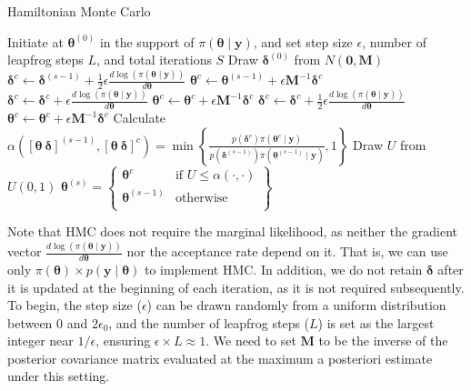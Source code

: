 \begin{algorithm}[h!]
	\caption{Hamiltonian Monte Carlo}\label{Alg:HMC}
	\begin{algorithmic}[1]
		\State Initiate at $\bm{\theta}^{(0)}$ in the support of $\pi(\bm{\theta}\mid \bm{y})$, and set step size $\epsilon$, number of leapfrog steps $L$, and total iterations $S$ 
		\State Draw $\bm{\delta}^{(0)}$ from $N(\bm{0}, \bm{M})$  		 			
					\State $\bm{\delta}^{c} \leftarrow \bm{\delta}^{(s-1)} + \frac{1}{2}\epsilon \frac{d\log(\pi(\bm{\theta}\mid \bm{y}))}{d\bm{\theta}}$
					\State $\bm{\theta}^c\leftarrow \bm{\theta}^{(s-1)}+\epsilon \bm{M}^{-1}\bm{\delta}^{c}$
				\Else
						\State $\bm{\delta}^{c} \leftarrow \bm{\delta}^{c} + \epsilon \frac{d\log(\pi(\bm{\theta}\mid \bm{y}))}{d\bm{\theta}}$
						\State $\bm{\theta}^c\leftarrow \bm{\theta}^c+\epsilon \bm{M}^{-1}\bm{\delta}^{c}$
					\Else
					 	\State $\bm{\delta}^{c} \leftarrow \bm{\delta}^{c} + \frac{1}{2}\epsilon \frac{d\log(\pi(\bm{\theta}\mid \bm{y}))}{d\bm{\theta}}$
					 	\State $\bm{\theta}^c\leftarrow \bm{\theta}^{c}+\epsilon \bm{M}^{-1}\bm{\delta}^{c}$
					\EndIf
				\EndIf
			\EndFor
		\State Calculate $\alpha([\bm{\theta} \ \bm{\delta}]^{(s-1)}, [\bm{\theta} \ \bm{\delta}]^{c}) = 
		\min\left\{\frac{p(\bm{\delta}^{c}) \pi(\bm{\theta}^{c} \mid  \bm{y})}{p(\bm{\delta}^{(s-1)}) \pi(\bm{\theta}^{(s-1)} \mid  \bm{y})}, 1\right\}$
		\State Draw $U$ from $U(0,1)$
		\State $\bm{\theta}^{(s)}=\begin{Bmatrix}
			\bm{\theta}^{c} & \text{if } U\leq \alpha(\cdot, \cdot)\\
			\bm{\theta}^{(s-1)} & \text{otherwise}\\
		\end{Bmatrix}$
		\EndFor 
	\end{algorithmic} 
\end{algorithm}

Note that HMC does not require the marginal likelihood, as neither the gradient vector \(\frac{d\log(\pi(\bm{\theta}\mid \bm{y}))}{d\bm{\theta}}\) nor the acceptance rate depend on it. That is, we can use only \(\pi(\bm{\theta})\times p(\bm{y}\mid \bm{\theta})\) to implement HMC. In addition, we do not retain \(\bm{\delta}\) after it is updated at the beginning of each iteration, as it is not required subsequently. To begin, the step size (\(\epsilon\)) can be drawn randomly from a uniform distribution between 0 and \(2\epsilon_0\), and the number of leapfrog steps (\(L\)) is set as the largest integer near \(1/\epsilon\), ensuring \(\epsilon \times L \approx 1\). We need to set \(\bm{M}\) to be the inverse of the posterior covariance matrix evaluated at the maximum a posteriori estimate under this setting. 

